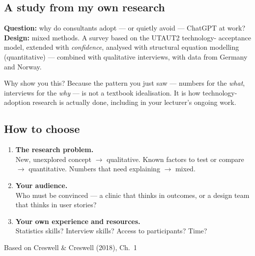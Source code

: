 \documentclass[11pt,a4paper,british,twoside=false,headings=small,chapterprefix=false,numbers=noenddot]{scrbook}
\newenvironment{block}[1]{\begin{tcolorbox}[scriptbox, title={#1}]}{\end{tcolorbox}}
\begin{document}
\subsection{A study from my own research}
\begin{center}\small
\begin{block}{ChatGPT adoption in Big Four consulting firms (Amling, ongoing)}
    \textbf{Question:} why do consultants adopt --- or quietly avoid ---
    ChatGPT at work?\\[0.3em]
    \textbf{Design:} mixed methods. A survey based on the UTAUT2 technology-%
    acceptance model, extended with \emph{confidence}, analysed with
    structural equation modelling (quantitative) --- combined with qualitative
    interviews, with data from Germany and Norway.
  \end{block}
  
  Why show you this? Because the pattern you just saw --- numbers for the
  \emph{what}, interviews for the \emph{why} --- is not a textbook idealisation.
  It is how technology-adoption research is actually done, including in your
  lecturer's ongoing work.
\end{center}


\subsection{How to choose}
\begin{center}\small
\begin{enumerate}\setlength{\itemsep}{0.6em}
    \item \textbf{The research problem.}\\
          New, unexplored concept $\rightarrow$ qualitative.
          Known factors to test or compare $\rightarrow$ quantitative.
          Numbers that need explaining $\rightarrow$ mixed.
    \item \textbf{Your audience.}\\
          Who must be convinced --- a clinic that thinks in outcomes,
          or a design team that thinks in user stories?
    \item \textbf{Your own experience and resources.}\\
          Statistics skills? Interview skills? Access to participants? Time?
  \end{enumerate}
  
  {\color{kgrey}\small Based on Creswell \& Creswell (2018), Ch.\ 1}
\end{center}
\end{document}
